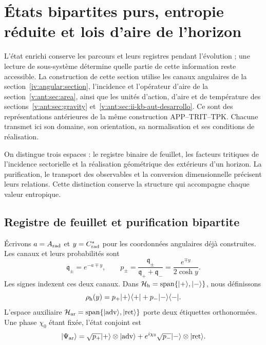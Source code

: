 
\section{États bipartites purs, entropie réduite et lois d’aire de l’horizon}
\label{vii:sec:horizontes-informacion}

L'état enrichi conserve les parcours et leurs registres pendant l'évolution ; une lecture de sous-système détermine quelle partie de cette information reste accessible. La construction de cette section utilise les canaux angulaires de la section~\ref{iv:angular:section}, l'incidence et l'opérateur d'aire de la section~\ref{v:ant:sec:area}, ainsi que les unités d'action, d'aire et de température des sections~\ref{v:ant:sec:gravity} et~\ref{v:ant:sec:ii-kb-aut-desarrollo}. Ce sont des représentations antérieures de la même construction APP--TRIT--TPK. Chacune transmet ici son domaine, son orientation, sa normalisation et ses conditions de réalisation.

On distingue trois espaces : le registre binaire de feuillet, les facteurs
tritiques de l'incidence sectorielle et la réalisation géométrique des
extérieurs d'un horizon. La purification, le transport des observables
et la conversion dimensionnelle précisent leurs relations. Cette
distinction conserve la structure qui accompagne chaque valeur entropique.

\subsection{Registre de feuillet et purification bipartite}
\label{vii:subsec:hojas-purificacion}

Écrivons \(a=A_{\rm rad}\) et \(y=C^*_{\rm rad}\) pour les
coordonnées angulaires déjà construites. Les canaux et leurs probabilités sont
\begin{equation}
 \mathfrak q_\pm=e^{-a\mp y},\qquad
 p_\pm=\frac{\mathfrak q_\pm}{\mathfrak q_++\mathfrak q_-}
       =\frac{e^{\mp y}}{2\cosh y}.
 \label{vii:eq:probabilidades-hoja}
\end{equation}
Les signes indexent ces deux canaux. Dans
\(\mathcal H_{\rm h}=\operatorname{span}\{|+\rangle,|-\rangle\}\),
nous définissons
\[
 \rho_{\rm h}(y)=p_+|+\rangle\langle+|+p_-|-\rangle\langle-|.
\]
L'espace auxiliaire \(\mathcal H_{\rm ar}=\operatorname{span}
\{|\mathrm{adv}\rangle,|\mathrm{ret}\rangle\}\) porte deux étiquettes orthonormées. Une phase \(\chi_0\) étant fixée, l'état conjoint est
\begin{equation}
 |\Psi_{\rm ar}\rangle
 =\sqrt{p_+}|+\rangle\otimes|\mathrm{adv}\rangle
  +e^{i\chi_0}\sqrt{p_-}|-\rangle\otimes|\mathrm{ret}\rangle.
 \label{vii:eq:purificacion-hoja}
\end{equation}

